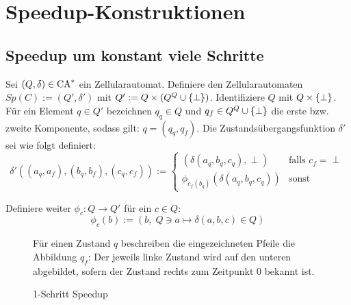 \chapter{Speedup-Konstruktionen}
\label{chap:SpeedupKonstr}

\section{Speedup um konstant viele Schritte}

\begin{definition}

    Sei $(Q, \delta) \in \textrm{CA}^*$ ein Zellularautomat.
    Definiere den Zellularautomaten $Sp(C) := (Q', \delta')$ mit $Q' := Q \times (Q^Q \cup \{ { \perp } \})$.
    Identifiziere $Q$ mit $Q \times \{ { \perp } \}$.
    Für ein Element $q \in Q'$ bezeichnen $q_q \in Q$ und $q_f \in Q^Q \cup \{ { \perp } \}$ die erste \acs{bzw.} zweite Komponente, sodass gilt: $q = (q_q, q_f)$.
    Die Zustandsübergangsfunktion $\delta'$ sei wie folgt definiert:
    \[
        \delta'((a_q, a_f), (b_q, b_f), (c_q, c_f)) :=
        \begin{cases}
            (\delta(a_q, b_q, c_q), \perp) & \text{falls } c_f = \perp \\
            \phi_{c_f(b_q)}(\delta(a_q, b_q, c_q)) & \text{sonst} 
        \end{cases}
    \]
    
    Definiere weiter $\phi_c: Q \to Q'$ für ein $c \in Q$:
    \[
        \phi_c(b) := (b, \; Q \ni a \mapsto \delta(a, b, c) \in Q)
    \]
    
    \begin{figure}[h!]
        \begin{center}
        
        \end{center}
        \caption{1-Schritt Speedup}
        
        Für einen Zustand $q$ beschreiben die eingezeichneten Pfeile die Abbildung $q_f$:
        Der jeweils linke Zustand wird auf den unteren abgebildet, sofern der Zustand rechts
        zum Zeitpunkt $0$ bekannt ist.
        \label{fig:KonstanterSpeedup}
    \end{figure}
\end{definition}

